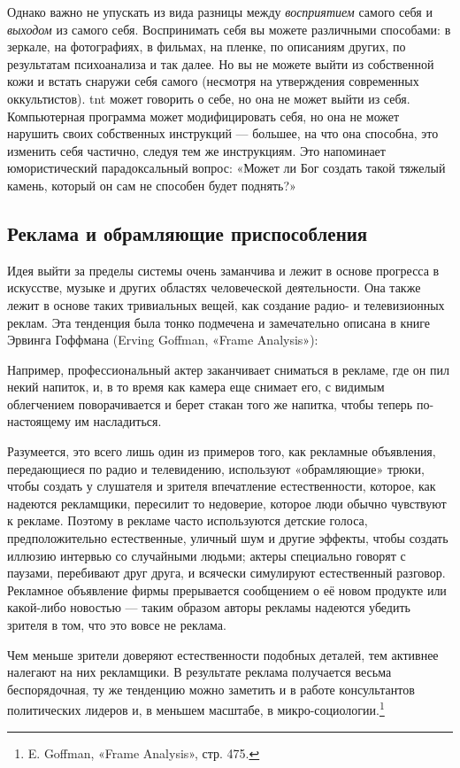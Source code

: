 \documentclass[../main.tex]{subfiles}
\begin{document}
Однако важно не упускать из вида разницы между \emph{восприятием} самого себя и \emph{выходом} из самого себя. Воспринимать себя вы можете различными способами: в зеркале, на фотографиях, в фильмах, на пленке, по описаниям других, по результатам психоанализа и так далее. Но вы не можете выйти из собственной кожи и встать снаружи себя самого (несмотря на утверждения современных оккультистов). \acs{tnt} может говорить о себе, но она не может выйти из себя. Компьютерная программа может модифицировать себя, но она не может нарушить своих собственных инструкций --- большее, на что она способна, это изменить себя частично, следуя тем же инструкциям. Это напоминает юмористический парадоксальный вопрос: «Может ли Бог создать такой тяжелый камень, который он сам не способен будет поднять?»


\subsection{Реклама и обрамляющие приспособления}

Идея выйти за пределы системы очень заманчива и лежит в основе прогресса в искусстве, музыке и других областях человеческой деятельности. Она также лежит в основе таких тривиальных вещей, как создание радио- и телевизионных реклам. Эта тенденция была тонко подмечена и замечательно описана в книге Эрвинга Гоффмана (Erving Goffman, «Frame Analysis»):

Например, профессиональный актер заканчивает сниматься в рекламе, где он пил некий напиток, и, в то время как камера еще снимает его, с видимым облегчением поворачивается и берет стакан того же напитка, чтобы теперь по-настоящему им насладиться.

Разумеется, это всего лишь один из примеров того, как рекламные объявления, передающиеся по радио и телевидению, используют «обрамляющие» трюки, чтобы создать у слушателя и зрителя впечатление естественности, которое, как надеются рекламщики, пересилит то недоверие, которое люди обычно чувствуют к рекламе. Поэтому в рекламе часто используются детские голоса, предположительно естественные, уличный шум и другие эффекты, чтобы создать иллюзию интервью со случайными людьми; актеры специально говорят с паузами, перебивают друг друга, и всячески симулируют естественный разговор. Рекламное объявление фирмы прерывается сообщением о её новом продукте или какой-либо новостью --- таким образом авторы рекламы надеются убедить зрителя в том, что это вовсе не реклама.

Чем меньше зрители доверяют естественности подобных деталей, тем активнее налегают на них рекламщики. В результате реклама получается весьма беспорядочная, ту же тенденцию можно заметить и в работе консультантов политических лидеров и, в меньшем масштабе, в микро-социологии.\footnote{E. Goffman, «Frame Analysis», стр. 475.}
\end{document}
